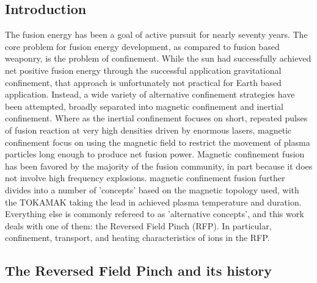 \begin{refsection}


\chapter{Introduction}
The fusion energy has been a goal of active pursuit for nearly seventy years.
The core problem for fusion energy development, as compared to fusion based
weaponry, is the problem of confinement. While the sun had successfully
achieved net positive fusion energy through the successful application
gravitational confinement, that approach is unfortunately not practical for
Earth based application. Instead, a wide variety of alternative confinement
strategies have been attempted, broadly separated into magnetic confinement and
inertial confinement. Where as the inertial confinement focuses on short,
repeated pulses of fusion reaction at very high densities driven by enormous
lasers, magnetic confinement focus on using the magnetic field to restrict the
movement of plasma particles long enough to produce net fusion power. Magnetic
confinement fusion has been favored by the majority of the fusion community, in
part because it does not involve high frequency explosions. magnetic
confinement fusion further divides into a number of 'concepts' based on the
magnetic topology used, with the TOKAMAK taking the lead in achieved plasma
temperature and duration. Everything else is commonly refereed to as
'alternative concepts', and this work deals with one of them: the Reversed
Field Pinch (RFP). In particular, confinement, transport, and heating
characteristics of ions in the RFP.


\section{The Reversed Field Pinch and its history}


\end{refsection}
